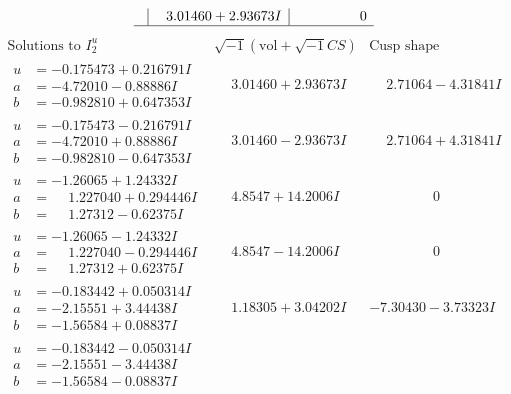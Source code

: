 \documentclass[1p]{elsarticle_modified}
\theoremstyle{definition}
\newcommand{\I}{\sqrt{-1}}
\begin{document}
$$\begin{array}{c|c|c}
 & \phantom{-}3.01460 + 2.93673 I & \phantom{-0.000000 } 0\\
 \hline 
 \end{array}$$\newpage$$\begin{array}{c|c|c}  
\text{Solutions to }I^u_{2}& \I (\text{vol} + \sqrt{-1}CS) & \text{Cusp shape}\\
 \hline 
\begin{aligned}
u &= -0.175473 + 0.216791 I \\
a &= -4.72010 - 0.88886 I \\
b &= -0.982810 + 0.647353 I\end{aligned}
 & \phantom{-}3.01460 + 2.93673 I & \phantom{-}2.71064 - 4.31841 I \\ \hline\begin{aligned}
u &= -0.175473 - 0.216791 I \\
a &= -4.72010 + 0.88886 I \\
b &= -0.982810 - 0.647353 I\end{aligned}
 & \phantom{-}3.01460 - 2.93673 I & \phantom{-}2.71064 + 4.31841 I \\ \hline\begin{aligned}
u &= -1.26065 + 1.24332 I \\
a &= \phantom{-}1.227040 + 0.294446 I \\
b &= \phantom{-}1.27312 - 0.62375 I\end{aligned}
 & \phantom{-}4.8547 + 14.2006 I & \phantom{-0.000000 } 0 \\ \hline\begin{aligned}
u &= -1.26065 - 1.24332 I \\
a &= \phantom{-}1.227040 - 0.294446 I \\
b &= \phantom{-}1.27312 + 0.62375 I\end{aligned}
 & \phantom{-}4.8547 - 14.2006 I & \phantom{-0.000000 } 0 \\ \hline\begin{aligned}
u &= -0.183442 + 0.050314 I \\
a &= -2.15551 + 3.44438 I \\
b &= -1.56584 + 0.08837 I\end{aligned}
 & \phantom{-}1.18305 + 3.04202 I & -7.30430 - 3.73323 I \\ \hline\begin{aligned}
u &= -0.183442 - 0.050314 I \\
a &= -2.15551 - 3.44438 I \\
b &= -1.56584 - 0.08837 I\end{aligned}

\end{array}$$
\end{document}
